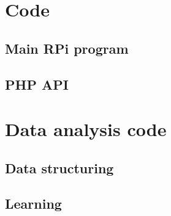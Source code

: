 \documentclass[11pt]{report}
\begin{document}
\chapter{Code}

\section{Main RPi program} \label{code:main_program}



\section{PHP API} \label{php_api}



%
%
%
%
%
%


\chapter{Data analysis code}

\section{Data structuring}

\section{Learning}
\end{document}
